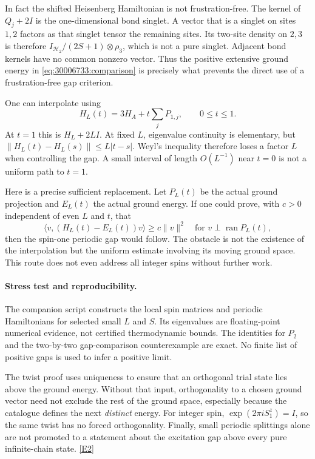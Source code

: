 \documentclass[11pt,a4paper]{article}
\newcommand{\eref}[2]{\hyperlink{extra:#1:#2}{[E#2]}}
\numberwithin{equation}{section}
\begin{document}
In fact the shifted Heisenberg Hamiltonian is not frustration-free.
The kernel of $Q_j+2I$ is the one-dimensional bond singlet. A vector that is
a singlet on sites $1,2$ factors as that singlet tensor the remaining sites.
Its two-site density on $2,3$ is therefore $I_{\mathcal H_2}/(2S+1)\otimes\rho_3$, which
is not a pure singlet. Adjacent bond kernels have no common nonzero vector.
Thus the positive extensive ground energy in
\eqref{eq:30006733:comparison} is precisely what prevents the direct use of a
frustration-free gap criterion.

One can interpolate using
\[
 H_L(t)=3H_A+t\sum_jP_{1,j},\qquad0\leq t\leq1.
\]
At $t=1$ this is $H_L+2LI$. At fixed $L$, eigenvalue continuity is elementary,
but $\|H_L(t)-H_L(s)\|\leq L|t-s|$. Weyl's inequality therefore loses a
factor $L$ when controlling the gap. A small interval of length $O(L^{-1})$
near $t=0$ is not a uniform path to $t=1$.

Here is a precise sufficient replacement. Let $P_L(t)$ be the actual
ground projection and $E_L(t)$ the actual ground energy. If one could prove,
with $c>0$ independent of even $L$ and $t$, that
\begin{equation}\label{eq:30006733:path}
 \langle v,(H_L(t)-E_L(t))v\rangle\geq c\|v\|^2
 \quad\text{for }v\perp\operatorname{ran}P_L(t),
\end{equation}
then the spin-one periodic gap would follow. The obstacle is not the
existence of the interpolation but the uniform estimate involving its
moving ground space. This route does not even address all integer spins
without further work.

\paragraph{Stress test and reproducibility.}
The companion script constructs the local spin matrices and periodic
Hamiltonians for selected small $L$ and $S$. Its eigenvalues are floating-point
numerical evidence, not certified thermodynamic bounds. The identities for
$P_2$ and the two-by-two gap-comparison counterexample are exact. No finite
list of positive gaps is used to infer a positive limit.

The twist proof uses uniqueness to ensure that an orthogonal trial state
lies above the ground energy. Without that input, orthogonality to a chosen
ground vector need not exclude the rest of the ground space, especially
because the catalogue defines the next \emph{distinct} energy. For integer
spin, $\exp(2\pi iS_1^z)=I$, so the same twist has no forced orthogonality.
Finally, small periodic splittings alone are not promoted to a statement
about the excitation gap above every pure infinite-chain state.
\eref{30006733}{2}
\end{document}
